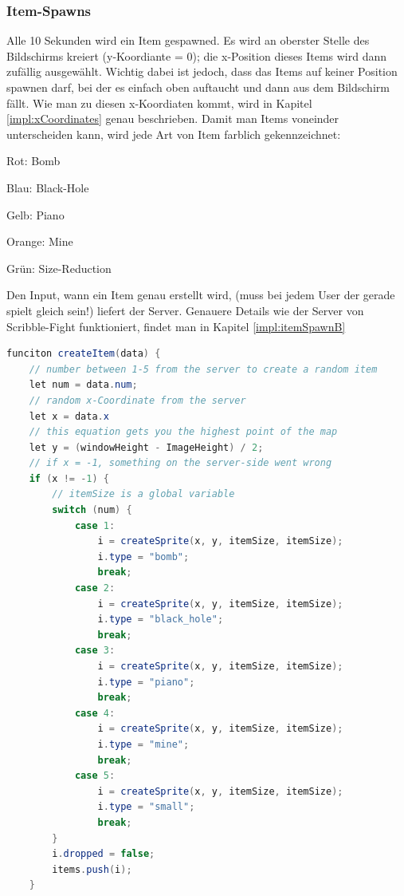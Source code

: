 \subsubsection{Item-Spawns} \label{impl:itemSpawnF}
Alle 10 Sekunden wird ein Item gespawned.
Es wird an oberster Stelle des Bildschirms kreiert (y-Koordiante = 0); die x-Position dieses Items wird dann zufällig ausgewählt. 
Wichtig dabei ist jedoch, dass das Items auf keiner Position spawnen darf, bei der es einfach oben auftaucht und dann aus dem Bildschirm fällt.
Wie man zu diesen x-Koordiaten kommt, wird in Kapitel \ref{impl:xCoordinates} genau beschrieben. 
Damit man Items voneinder unterscheiden kann, wird jede Art von Item farblich gekennzeichnet:

\begin{compactitem}
    \item Rot: Bomb
    \item Blau: Black-Hole
    \item Gelb: Piano
    \item Orange: Mine
    \item Grün: Size-Reduction
\end{compactitem}

Den Input, wann ein Item genau erstellt wird, (muss bei jedem User der gerade spielt gleich sein!) liefert der Server. Genauere Details wie der Server von Scribble-Fight funktioniert, findet man in Kapitel \ref{impl:itemSpawnB}
\\

\begin{lstlisting}[caption=Erstellen eines Items,language=Java,label=lst:impl:createItem]
funciton createItem(data) {
    // number between 1-5 from the server to create a random item
    let num = data.num;
    // random x-Coordinate from the server
    let x = data.x
    // this equation gets you the highest point of the map
    let y = (windowHeight - ImageHeight) / 2;
    // if x = -1, something on the server-side went wrong
    if (x != -1) {
        // itemSize is a global variable
        switch (num) {
            case 1:
                i = createSprite(x, y, itemSize, itemSize);
                i.type = "bomb";
                break;
            case 2:
                i = createSprite(x, y, itemSize, itemSize);
                i.type = "black_hole";
                break;
            case 3:
                i = createSprite(x, y, itemSize, itemSize);
                i.type = "piano";
                break;
            case 4:
                i = createSprite(x, y, itemSize, itemSize);
                i.type = "mine";
                break;
            case 5:
                i = createSprite(x, y, itemSize, itemSize);
                i.type = "small";
                break;
        }
        i.dropped = false;
        items.push(i);
    }
\end{lstlisting}

